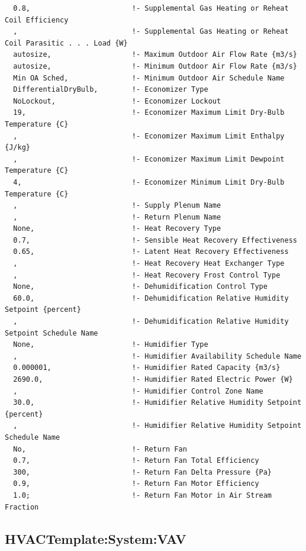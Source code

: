 \begin{lstlisting}
  0.8,                        !- Supplemental Gas Heating or Reheat Coil Efficiency
  ,                           !- Supplemental Gas Heating or Reheat Coil Parasitic . . . Load {W}
  autosize,                   !- Maximum Outdoor Air Flow Rate {m3/s}
  autosize,                   !- Minimum Outdoor Air Flow Rate {m3/s}
  Min OA Sched,               !- Minimum Outdoor Air Schedule Name
  DifferentialDryBulb,        !- Economizer Type
  NoLockout,                  !- Economizer Lockout
  19,                         !- Economizer Maximum Limit Dry-Bulb Temperature {C}
  ,                           !- Economizer Maximum Limit Enthalpy {J/kg}
  ,                           !- Economizer Maximum Limit Dewpoint Temperature {C}
  4,                          !- Economizer Minimum Limit Dry-Bulb Temperature {C}
  ,                           !- Supply Plenum Name
  ,                           !- Return Plenum Name
  None,                       !- Heat Recovery Type
  0.7,                        !- Sensible Heat Recovery Effectiveness
  0.65,                       !- Latent Heat Recovery Effectiveness
  ,                           !- Heat Recovery Heat Exchanger Type
  ,                           !- Heat Recovery Frost Control Type
  None,                       !- Dehumidification Control Type
  60.0,                       !- Dehumidification Relative Humidity Setpoint {percent}
  ,                           !- Dehumidification Relative Humidity Setpoint Schedule Name
  None,                       !- Humidifier Type
  ,                           !- Humidifier Availability Schedule Name
  0.000001,                   !- Humidifier Rated Capacity {m3/s}
  2690.0,                     !- Humidifier Rated Electric Power {W}
  ,                           !- Humidifier Control Zone Name
  30.0,                       !- Humidifier Relative Humidity Setpoint {percent}
  ,                           !- Humidifier Relative Humidity Setpoint Schedule Name
  No,                         !- Return Fan
  0.7,                        !- Return Fan Total Efficiency
  300,                        !- Return Fan Delta Pressure {Pa}
  0.9,                        !- Return Fan Motor Efficiency
  1.0;                        !- Return Fan Motor in Air Stream Fraction
\end{lstlisting}

\subsection{HVACTemplate:System:VAV}\label{hvactemplatesystemvav}

